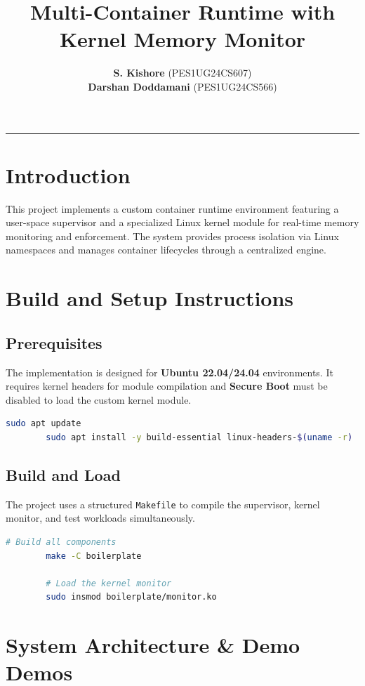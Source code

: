 \documentclass[11pt, a4paper]{article}
\title{\textbf{Multi-Container Runtime with Kernel Memory Monitor}}
\author{
	\textbf{S. Kishore} (PES1UG24CS607) \\
	\textbf{Darshan Doddamani} (PES1UG24CS566)
}
\date{}
\begin{document}
	
	\maketitle
	
	\hrule
	\vspace{0.5cm}
	
	\section{Introduction}
	This project implements a custom container runtime environment featuring a user-space supervisor and a specialized Linux kernel module for real-time memory monitoring and enforcement. The system provides process isolation via Linux namespaces and manages container lifecycles through a centralized engine.
	
	\section{Build and Setup Instructions}
	
	\subsection{Prerequisites}
	The implementation is designed for \textbf{Ubuntu 22.04/24.04} environments. It requires kernel headers for module compilation and \textbf{Secure Boot} must be disabled to load the custom kernel module.
	
	\begin{lstlisting}[language=bash]
		sudo apt update
		sudo apt install -y build-essential linux-headers-$(uname -r)
	\end{lstlisting}
	
	\subsection{Build and Load}
	The project uses a structured \texttt{Makefile} to compile the supervisor, kernel monitor, and test workloads simultaneously.
	
	\begin{lstlisting}[language=bash]
		# Build all components
		make -C boilerplate
		
		# Load the kernel monitor
		sudo insmod boilerplate/monitor.ko
	\end{lstlisting}
	
	\section{System Architecture \& Demo Demos}
	
\end{document}
